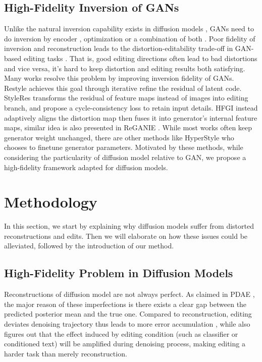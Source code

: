 \documentclass[letterpaper]{article} %
\begin{document}
\subsection{High-Fidelity Inversion of GANs}
Unlike the natural inversion capability exists in diffusion models \cite{song2020denoising}, GANs \cite{goodfellow2020generative} need to do inversion by encoder \cite{richardson2021encoding}, optimization \cite{abdal2020image2stylegan++} or a combination of both \cite{zhu2020domain}. Poor fidelity of inversion and reconstruction leads to the distortion-editability trade-off in GAN-based editing tasks \cite{tov2021designing}. That is, good editing directions often lead to bad distortions and vice versa, it's hard to keep distortion and editing results both satisfying. Many works resolve this problem by improving inversion fidelity of GANs. Restyle \cite{alaluf2021restyle} achieves this goal through iterative refine the residual of latent code. StyleRes \cite{pehlivan2023styleres} transforms the residual of feature maps instead of images into editing branch, and propose a cycle-consistency loss to retain input details. HFGI \cite{wang2022high} instead adaptively aligns the distortion map then fuses it into generator's internal feature maps, similar idea is also presented in ReGANIE \cite{li2023reganie}. While most works often keep generator weight unchanged, there are other methods like HyperStyle \cite{alaluf2022hyperstyle} who chooses to finetune generator parameters. Motivated by these methods, while considering the particularity of diffusion model relative to GAN, we propose a high-fidelity framework adapted for diffusion models.

\section{Methodology}

In this section, we start by explaining why diffusion models suffer from distorted reconstructions and edits. Then we will elaborate on how these issues could be alleviated, followed by the introduction of our method.

\subsection{High-Fidelity Problem in Diffusion Models}

Reconstructions of diffusion model are not always perfect. As claimed in PDAE \cite{zhang2022unsupervised},
the major reason of these imperfections
is there exists a clear gap between the predicted posterior mean and the true one. Compared to reconstruction, editing deviates denoising trajectory thus leads to more error accumulation \cite{mokady2023null}, while \cite{ho2022classifier} also figures out that the effect induced by editing condition (such as classifier or conditioned text) will be amplified during denoising process, making editing a harder task than merely reconstruction.
\end{document}
